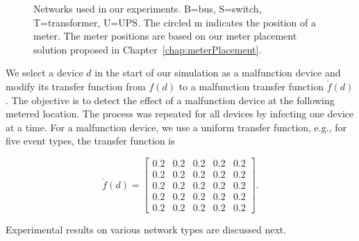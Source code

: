 \begin{figure}[!p]
\centering
{}

\begin{centering}
\end{centering}

\begin{centering}
\end{centering}

\begin{centering}
\end{centering}

\caption{Networks used in our experiments. B=bus, S=switch, T=transformer,
U=UPS. The circled m indicates the position of a meter. The meter positions are based on our meter placement solution proposed in Chapter~\ref{chap:meterPlacement}.} 
\label{mf_networks_used}
\end{figure}

We select a device $d$ in the start of our simulation as a malfunction device and modify its transfer function from $f(d)$ to a malfunction transfer function $\acute f(d)$. The objective is to detect the effect of a malfunction device at the following metered location. The process was repeated for all devices by infecting one device at a time. For a malfunction device, we use a uniform transfer function, e.g., for five event types, the transfer function is

\[\acute f(d) = \left[\begin{array}{ccccc}
0.2 & 0.2 & 0.2 & 0.2 & 0.2\\
0.2 & 0.2 & 0.2 & 0.2 & 0.2\\
0.2 & 0.2 & 0.2 & 0.2 & 0.2\\
0.2 & 0.2 & 0.2 & 0.2 & 0.2\\
0.2 & 0.2 & 0.2 & 0.2 & 0.2\end{array}\right].\]

\noindent Experimental results on various network types are discussed next.



